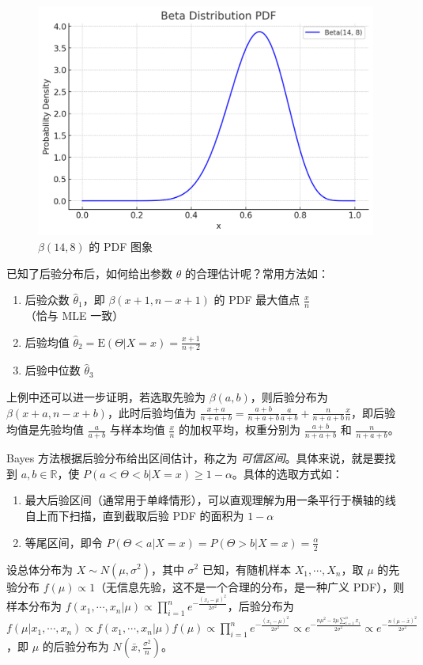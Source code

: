 \documentclass[../main.tex]{subfiles}
\begin{document}
\begin{figure}[!h]
    \centering
    \includegraphics[scale=0.4]{figures/beta(14,8).png}
    \caption{$\beta(14,8)$ 的 PDF 图象}
    \label{fig:6.5.1}
\end{figure}

已知了后验分布后，如何给出参数 $\theta$ 的合理估计呢？常用方法如：
\begin{enumerate}
    \item 后验众数 $\hat\theta_1$，即 $\beta(x+1,n-x+1)$ 的 PDF 最大值点 $\frac xn$（恰与 MLE 一致）
    \item 后验均值 $\hat\theta_2=\mathrm E(\Theta|X=x)=\frac{x+1}{n+2}$
    \item 后验中位数 $\hat\theta_3$
\end{enumerate}

上例中还可以进一步证明，若选取先验为 $\beta(a,b)$，则后验分布为 $\beta(x+a,n-x+b)$，此时后验均值为 $\frac{x+a}{n+a+b}=\frac{a+b}{n+a+b}\frac{a}{a+b}+\frac{n}{n+a+b}\frac{x}{n}$，即后验均值是先验均值 $\frac a{a+b}$ 与样本均值 $\frac xn$ 的加权平均，权重分别为 $\frac{a+b}{n+a+b}$ 和 $\frac{n}{n+a+b}$。

Bayes 方法根据后验分布给出区间估计，称之为 \emph{可信区间}。具体来说，就是要找到 $a,b\in\mathbb R$，使 $P(a<\Theta<b|X=x)\geq1-\alpha$。具体的选取方式如：
\begin{enumerate}
    \item 最大后验区间（通常用于单峰情形），可以直观理解为用一条平行于横轴的线自上而下扫描，直到截取后验 PDF 的面积为 $1-\alpha$
    \item 等尾区间，即令 $P(\Theta<a|X=x)=P(\Theta>b|X=x)=\frac\alpha2$
\end{enumerate}

\begin{example}
    设总体分布为 $X\sim N(\mu,\sigma^2)$，其中 $\sigma^2$ 已知，有随机样本 $X_1,\cdots,X_n$，取 $\mu$ 的先验分布 $f(\mu)\propto 1$（无信息先验，这不是一个合理的分布，是一种广义 PDF），则样本分布为 $f(x_1,\cdots,x_n|\mu)\propto\prod_{i=1}^ne^{-\frac{(x_i-\mu)^2}{2\sigma^2}}$，后验分布为 $f(\mu|x_1,\cdots,x_n)\propto f(x_1,\cdots,x_n|\mu)f(\mu)\propto\prod_{i=1}^ne^{-\frac{(x_i-\mu)^2}{2\sigma^2}}\propto e^{-\frac{n\mu^2-2\mu\sum_{i=1}^nx_i}{2\sigma^2}}\propto e^{-\frac{n(\mu-\bar x)^2}{2\sigma^2}}$，即 $\mu$ 的后验分布为 $N(\bar x,\frac{\sigma^2}{n})$。
\end{example}
\end{document}
